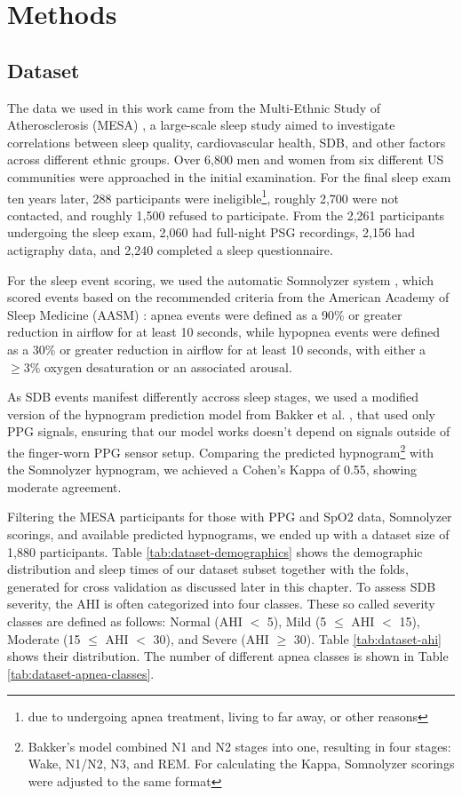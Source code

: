 \chapter{Methods \label{Chapter-Methods}}

\section{Dataset}

The data we used in this work came from the Multi-Ethnic Study of Atherosclerosis (MESA) \cite{chen2015racial}, a large-scale sleep study aimed to investigate correlations between sleep quality, cardiovascular health, SDB, and other factors across different ethnic groups.
Over 6,800 men and women from six different US communities were approached in the initial examination. For the final sleep exam ten years later, 288 participants were ineligible\footnote{due to undergoing apnea treatment, living to far away, or other reasons}, roughly 2,700 were not contacted, and roughly 1,500 refused to participate. From the 2,261 participants undergoing the sleep exam, 2,060 had full-night PSG recordings, 2,156 had actigraphy data, and 2,240 completed a sleep questionnaire.

For the sleep event scoring, we used the automatic Somnolyzer system \cite{anderer2022automated}, which scored events based on the recommended criteria from the American Academy of Sleep Medicine (AASM) \cite{troester2023aasm}: apnea events were defined as a 90\% or greater reduction in airflow for at least 10 seconds, while hypopnea events were defined as a 30\% or greater reduction in airflow for at least 10 seconds, with either a $\geq 3\%$ oxygen desaturation or an associated arousal.

As SDB events manifest differently accross sleep stages, we used a modified version of the hypnogram prediction model from Bakker et al. \cite{bakker2021estimating}, that used only PPG signals, ensuring that our model works doesn't depend on signals outside of the finger-worn PPG sensor setup. Comparing the predicted hypnogram\footnote{Bakker's model combined N1 and N2 stages into one, resulting in four stages: Wake, N1/N2, N3, and REM. For calculating the Kappa, Somnolyzer scorings were adjusted to the same format} with the Somnolyzer hypnogram, we achieved a Cohen's Kappa of 0.55, showing moderate agreement.

Filtering the MESA participants for those with PPG and SpO2 data, Somnolyzer scorings, and available predicted hypnograms, we ended up with a dataset size of 1,880 participants. Table \ref{tab:dataset-demographics} shows the demographic distribution and sleep times of our dataset subset together with the folds, generated for cross validation as discussed later in this chapter.
To assess SDB severity, the AHI is often categorized into four classes. These so called severity classes are defined as follows: Normal (AHI $<$ 5), Mild (5 $\le$ AHI $<$ 15), Moderate (15 $\le$ AHI $<$ 30), and Severe (AHI $\ge$ 30).
Table \ref{tab:dataset-ahi} shows their distribution.
The number of different apnea classes is shown in Table \ref{tab:dataset-apnea-classes}.

